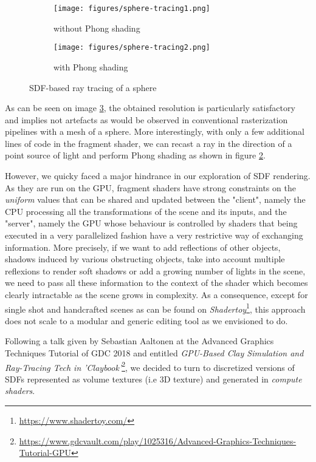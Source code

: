 \documentclass[10pt,a4paper,english, twocolumn]{article}
\begin{document}
\begin{figure}
    \begin{subfigure}{.5\linewidth}
        \centering
        \texttt{[image: figures/sphere-tracing1.png]}
        \caption{without Phong shading}
        \label{sfig:sphere-tracing1}
    \end{subfigure}%
    \begin{subfigure}{.5\linewidth}
        \centering
        \texttt{[image: figures/sphere-tracing2.png]}
        \caption{with Phong shading}
        \label{sfig:sphere-tracing2}
    \end{subfigure}
    \caption{SDF-based ray tracing of a sphere}
    \label{fig:sphere-tracing}
\end{figure}

As can be seen on image \ref{fig:sphere-tracing}, the obtained resolution is particularly satisfactory and implies not artefacts as would be observed in conventional rasterization pipelines with a mesh of a sphere. More interestingly, with only a few additional lines of code in the fragment shader, we can recast a ray in the direction of a point source of light and perform Phong shading as shown in figure \ref{sfig:sphere-tracing2}.

However, we quicky faced a major hindrance in our exploration of SDF rendering. As they are run on the GPU, fragment shaders have strong constraints on the \textit{uniform} values that can be shared and updated between the "client", namely the CPU processing all the transformations of the scene and its inputs, and the "server", namely the GPU whose behaviour is controlled by shaders that being executed in a very parallelized fashion have a very restrictive way of exchanging information. More precisely, if we want to add reflections of other objects, shadows induced by various obstructing objects, take into account multiple reflexions to render soft shadows or add a growing number of lights in the scene, we need to pass all these information to the context of the shader which becomes clearly intractable as the scene grows in complexity. As a consequence, except for single shot and handcrafted scenes as can be found on \textit{Shadertoy}\footnote{\url{https://www.shadertoy.com/}}, this approach does not scale to a modular and generic editing tool as we envisioned to do.

Following a talk given by Sebastian Aaltonen at the Advanced Graphics Techniques Tutorial of GDC 2018 and entitled \textit{GPU-Based Clay Simulation and Ray-Tracing Tech in 'Claybook'}\footnote{\url{https://www.gdcvault.com/play/1025316/Advanced-Graphics-Techniques-Tutorial-GPU}}, we decided to turn to discretized versions of SDFs represented as volume textures (i.e 3D texture) and generated in \textit{compute shaders}.
\end{document}
